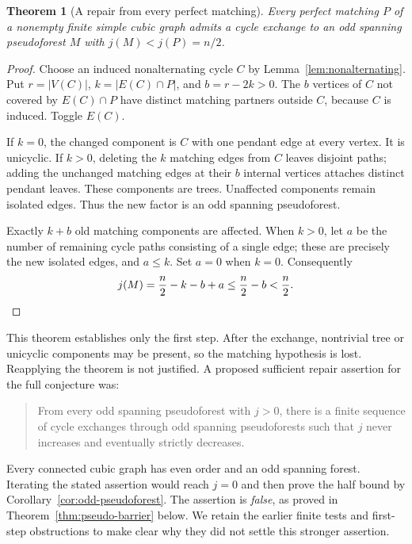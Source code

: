 \documentclass[11pt]{article}
\newtheorem{theorem}{Theorem}[section]
\begin{document}
\begin{theorem}[A repair from every perfect matching]\label{thm:matching-repair}
Every perfect matching $P$ of a nonempty finite simple cubic graph admits
a cycle exchange to an odd spanning pseudoforest $M$ with
$j(M)<j(P)=n/2$.
\end{theorem}
\begin{proof}
Choose an induced nonalternating cycle $C$ by
Lemma~\ref{lem:nonalternating}. Put $r=|V(C)|$,
$k=|E(C)\cap P|$, and $b=r-2k>0$. The $b$ vertices of $C$
not covered by $E(C)\cap P$ have distinct matching partners
outside $C$, because $C$ is induced. Toggle $E(C)$.

If $k=0$, the changed component is $C$ with one pendant edge
at every vertex. It is unicyclic. If $k>0$, deleting the $k$
matching edges from $C$ leaves disjoint paths; adding the
unchanged matching edges at their $b$ internal vertices attaches
distinct pendant leaves. These components are trees. Unaffected
components remain isolated edges. Thus the new factor is an odd
spanning pseudoforest.

Exactly $k+b$ old matching components are affected. When $k>0$,
let $a$ be the number of remaining cycle paths consisting of a
single edge; these are precisely the new isolated edges, and
$a\leq k$. Set $a=0$ when $k=0$. Consequently
\[
 j(M)=\frac n2-k-b+a\leq\frac n2-b<\frac n2.\qedhere
\]
\end{proof}

This theorem establishes only the first step. After the exchange,
nontrivial tree or unicyclic components may be present, so the
matching hypothesis is lost. Reapplying the theorem is not justified.
A proposed sufficient repair assertion for the full conjecture was:
\begin{quote}
From every odd spanning pseudoforest with $j>0$, there is a finite
sequence of cycle exchanges through odd spanning pseudoforests
such that $j$ never increases and eventually strictly decreases.
\end{quote}
Every connected cubic graph has even order and an odd spanning
forest. Iterating the stated assertion would reach $j=0$ and then
prove the half bound by Corollary~\ref{cor:odd-pseudoforest}.
The assertion is \emph{false}, as proved in
Theorem~\ref{thm:pseudo-barrier} below. We retain the earlier finite
tests and first-step obstructions to make clear why they did not
settle this stronger assertion.
\end{document}
